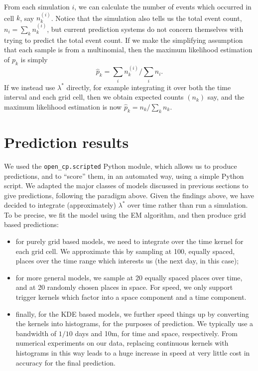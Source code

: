 \documentclass[twoside,a4paper]{article}
\theoremstyle{plain}
\theoremstyle{definition}
\begin{document}
From each simulation $i$, we can calculate the number of events which occurred in cell $k$, say
$n_k^{(i)}$.  Notice that the simulation also tells us the total event count, $n_i=\sum_k n^{(i)}_k$,
but current prediction systems do not concern themselves with trying to predict the total
event count.  If we make the simplifying assumption that each sample is from a multinomial, then the
maximum likelihood estimation of $p_k$ is simply
\[ \hat p_k = \sum_i n_k^{(i)} / \sum_i n_i. \]
If we instead use $\lambda^*$ directly, for example integrating it over both the time interval and
each grid cell, then we obtain expected counts $(n_k)$ say, and the maximum likelihood estimation
is now $\hat p_k = n_k / \sum_k n_k$.



\section{Prediction results}\label{sec:actual_preds}

We used the \texttt{open\_cp.scripted} Python module, which allows us to produce predictions,
and to ``score'' them, in an automated way, using a simple Python script.  We adapted the
major classes of models discussed in previous sections to give predictions, following the
paradigm above.  Given the findings above, we have decided to integrate (approximately)
$\lambda^*$ over time rather than run a simulation.
To be precise, we fit the model using the EM algorithm, and then produce
grid based predictions:
\begin{itemize}
\item for purely grid based models, we need to integrate over the time kernel for each
grid cell.  We approximate this by sampling at 100, equally spaced, places over the time
range which interests us (the next day, in this case);
\item for more general models, we sample at 20 equally spaced places over time, and at 20 randomly
chosen places in space.  For speed, we only support trigger kernels which factor into a space
component and a time component.
\item finally, for the KDE based models, we further speed things up by converting the
kernels into histograms, for the purposes of prediction.  We typically use a bandwidth of
$1/10$ days and 10m, for time and space, respectively.  From numerical experiments on our data,
replacing continuous kernels with histograms in this way leads to a huge increase in speed
at very little cost in accuracy for the final prediction.
\end{itemize}
\end{document}
